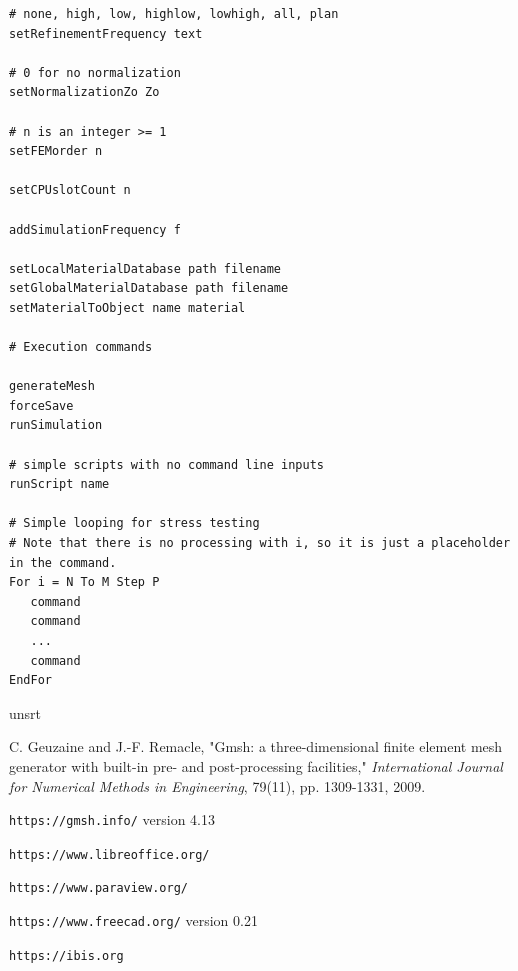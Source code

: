\documentclass[titlepage]{article}
\renewcommand\_{\textunderscore\linebreak[1]}
\begin{document}
\begin{Verbatim}[fontsize=\small]
# none, high, low, highlow, lowhigh, all, plan
setRefinementFrequency text

# 0 for no normalization
setNormalizationZo Zo

# n is an integer >= 1
setFEMorder n

setCPUslotCount n

addSimulationFrequency f

setLocalMaterialDatabase path filename
setGlobalMaterialDatabase path filename
setMaterialToObject name material

# Execution commands

generateMesh
forceSave
runSimulation

# simple scripts with no command line inputs
runScript name

# Simple looping for stress testing
# Note that there is no processing with i, so it is just a placeholder in the command.
For i = N To M Step P
   command
   command
   ...
   command
EndFor

\end{Verbatim}

\newpage
\begin{thebibliography}{unsrt}

 C. Geuzaine and J.-F. Remacle, "Gmsh: a three-dimensional finite element mesh generator with built-in pre- and post-processing facilities," \textit{International Journal for Numerical Methods in Engineering}, 79(11), pp. 1309-1331, 2009.

 \verb+https://gmsh.info/+ version 4.13

 \verb+https://www.libreoffice.org/+

 \verb+https://www.paraview.org/+

 \verb+https://www.freecad.org/+ version 0.21

 \verb+https://ibis.org+


\end{thebibliography}
\end{document}
